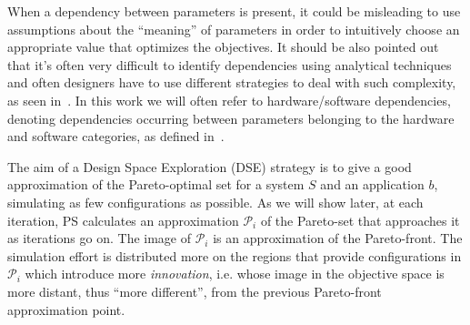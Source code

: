 When a dependency between parameters is present, it could be
misleading to use assumptions about the ``meaning'' of
parameters in order to intuitively choose an appropriate value that
optimizes the objectives.  It should be also pointed
out that it's often very difficult to identify dependencies using
analytical techniques and often designers have to use different
strategies to deal with such complexity, as seen
in~. In this work we will often refer to
hardware/software dependencies, denoting dependencies occurring
between parameters belonging to the hardware and software categories,
as defined in~.

The aim of a Design Space Exploration (DSE) strategy is to give a
good approximation of the Pareto-optimal set for a system $S$ and an
application $b$, simulating as few configurations as possible.
As we will show later, at each iteration, PS calculates an approximation $\mathscr{P}_i$ of the Pareto-set that approaches it as iterations go on. The image of $\mathscr{P}_i$ is an approximation of the Pareto-front.
The simulation effort is distributed more on the regions that provide configurations in $\mathscr{P}_i$ which introduce more \emph{innovation}, i.e. whose image in the objective space is more distant, thus ``more different'', from the previous Pareto-front approximation point.






